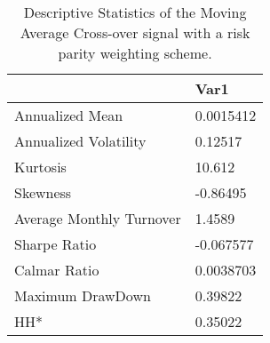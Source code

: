 \begin{table}[H]
\centering
\begin{tabular}{ll}
& Var1 \\ 
\hline 
Annualized Mean & 0.0015412 \\ 
Annualized Volatility & 0.12517 \\ 
Kurtosis & 10.612 \\ 
Skewness & -0.86495 \\ 
Average Monthly Turnover & 1.4589 \\ 
Sharpe Ratio & -0.067577 \\ 
Calmar Ratio & 0.0038703 \\ 
Maximum DrawDown & 0.39822 \\ 
HH* & 0.35022 \\ 
\hline
\end{tabular}
\caption{Descriptive Statistics of the Moving Average Cross-over signal with a risk parity weighting scheme.}
\label{MARP}
\end{table}